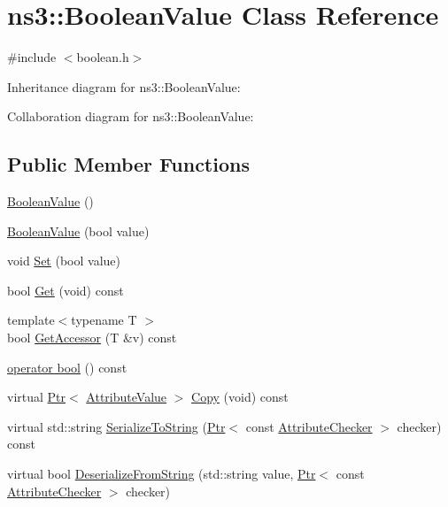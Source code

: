 \hypertarget{classns3_1_1BooleanValue}{}\section{ns3\+:\+:Boolean\+Value Class Reference}
\label{classns3_1_1BooleanValue}


{\ttfamily \#include $<$boolean.\+h$>$}



Inheritance diagram for ns3\+:\+:Boolean\+Value\+:


Collaboration diagram for ns3\+:\+:Boolean\+Value\+:
\subsection*{Public Member Functions}
\begin{DoxyCompactItemize}
\item 
\hyperlink{classns3_1_1BooleanValue_a720c699aa490b3f003216d44936373d2}{Boolean\+Value} ()
\item 
\hyperlink{classns3_1_1BooleanValue_a07653e76ffbdc1988ede895ac622620b}{Boolean\+Value} (bool value)
\item 
void \hyperlink{classns3_1_1BooleanValue_a795cbab5070bb0f9b14b68c885630acb}{Set} (bool value)
\item 
bool \hyperlink{classns3_1_1BooleanValue_a15d5d96abfd11676964f40859442ec12}{Get} (void) const 
\item 
{\footnotesize template$<$typename T $>$ }\\bool \hyperlink{classns3_1_1BooleanValue_a7218e606f1168e22a8d6d4e5bb80ceb9}{Get\+Accessor} (T \&v) const 
\item 
\hyperlink{classns3_1_1BooleanValue_afe959e280680339bbc91eb7617a048b1}{operator bool} () const 
\item 
virtual \hyperlink{classns3_1_1Ptr}{Ptr}$<$ \hyperlink{classns3_1_1AttributeValue}{Attribute\+Value} $>$ \hyperlink{classns3_1_1BooleanValue_aa7e96ca4f09e713eb61177032d1de622}{Copy} (void) const 
\item 
virtual std\+::string \hyperlink{classns3_1_1BooleanValue_a3de1dce9fe51590d1802b6b8c2897933}{Serialize\+To\+String} (\hyperlink{classns3_1_1Ptr}{Ptr}$<$ const \hyperlink{classns3_1_1AttributeChecker}{Attribute\+Checker} $>$ checker) const 
\item 
virtual bool \hyperlink{classns3_1_1BooleanValue_af77489821f861891b436f6a6717e5e08}{Deserialize\+From\+String} (std\+::string value, \hyperlink{classns3_1_1Ptr}{Ptr}$<$ const \hyperlink{classns3_1_1AttributeChecker}{Attribute\+Checker} $>$ checker)
\end{DoxyCompactItemize}
